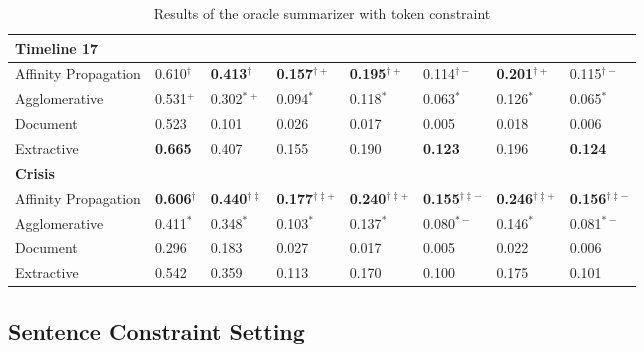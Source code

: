 \documentclass[a4paper,BCOR=10mm]{report}
\numberwithin{lemma}{chapter}
\numberwithin{definition}{chapter}
\begin{document}
\begin{table}
\begin{tabular}{|l|lllllll|}
\hline
\multicolumn{8}{|l|}{\textbf{Timeline 17}}\\\hline
Affinity Propagation & 0.610$^{\dagger}$&\textbf{0.413}$^{\dagger}$&\textbf{0.157}$^{\dagger+}$&\textbf{0.195}$^{\dagger+}$&0.114$^{\dagger-}$&\textbf{0.201}$^{\dagger+}$&0.115$^{\dagger-}$\\\hline
Agglomerative & 0.531$^{+}$&0.302$^{*+}$&0.094$^{*}$&0.118$^{*}$&0.063$^{*}$&0.126$^{*}$&0.065$^{*}$\\\hline
Document & 0.523&0.101&0.026&0.017&0.005&0.018&0.006\\\hline
Extractive & \textbf{0.665}&0.407&0.155&0.190&\textbf{0.123}&0.196&\textbf{0.124}\\\hline
\hline\multicolumn{8}{|l|}{\textbf{Crisis}}\\\hline
Affinity Propagation & \textbf{0.606}$^{\dagger}$&\textbf{0.440}$^{\dagger\ddagger}$&\textbf{0.177}$^{\dagger\ddagger+}$&\textbf{0.240}$^{\dagger\ddagger+}$&\textbf{0.155}$^{\dagger\ddagger-}$&\textbf{0.246}$^{\dagger\ddagger+}$&\textbf{0.156}$^{\dagger\ddagger-}$\\\hline
Agglomerative & 0.411$^{*}$&0.348$^{*}$&0.103$^{*}$&0.137$^{*}$&0.080$^{*-}$&0.146$^{*}$&0.081$^{*-}$\\\hline
Document & 0.296&0.183&0.027&0.017&0.005&0.022&0.006\\\hline
Extractive & 0.542&0.359&0.113&0.170&0.100&0.175&0.101\\\hline
\end{tabular}

\caption{Results of the oracle summarizer with token constraint}
\label{tab:results-oracle-tok}

\end{table}




\subsection{Sentence Constraint Setting}
\end{document}
